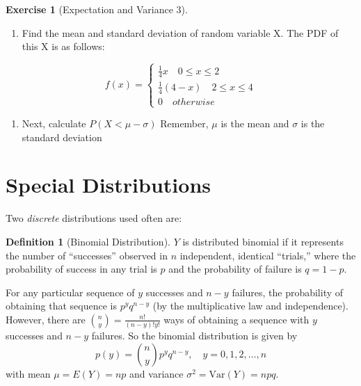 \documentclass[
]{book}
\providecommand{\tightlist}{%
  \setlength{\itemsep}{0pt}\setlength{\parskip}{0pt}}
\theoremstyle{definition}
\newtheorem{definition}{Definition}[chapter]
\theoremstyle{definition}
\theoremstyle{definition}
\newtheorem{exercise}{Exercise}[chapter]
\theoremstyle{definition}
\theoremstyle{remark}
\begin{document}
\begin{exercise}[Expectation and Variance 3]
\protect\hypertarget{exr:expvar3}{}{\label{exr:expvar3} {} }

\begin{enumerate}
\def\labelenumi{\arabic{enumi}.}
\tightlist
\item
  Find the mean and standard deviation of random variable X. The PDF of this X is as follows:
\end{enumerate}

\[f(x) =  \begin{cases}
              \frac{1}{4}x \quad 0 \leq x \leq 2\\
               \frac{1}{4}(4 - x)  \quad 2 \leq x \leq 4\\
               0 \quad otherwise
            \end{cases}
               \]

\begin{enumerate}
\def\labelenumi{\arabic{enumi}.}
\setcounter{enumi}{1}
\tightlist
\item
  Next, calculate \(P(X < \mu - \sigma)\) Remember, \(\mu\) is the mean and \(\sigma\) is the standard deviation
\end{enumerate}
\end{exercise}

\hypertarget{special-distributions}{%
\section{Special Distributions}\label{special-distributions}}

Two \emph{discrete} distributions used often are:

\begin{definition}[Binomial Distribution]
\protect\hypertarget{def:unnamed-chunk-274}{}{\label{def:unnamed-chunk-274} {} }\(Y\) is distributed binomial if it represents the number of ``successes'' observed in \(n\) independent, identical ``trials,'' where the probability of success in any trial is \(p\) and the probability of failure is \(q=1-p\).
\end{definition}

For any particular sequence of \(y\) successes and \(n-y\) failures, the probability of obtaining that sequence is \(p^y q^{n-y}\) (by the multiplicative law and independence). However, there are \(\binom{n}{y}=\frac{n!}{(n-y)!y!}\) ways of obtaining a sequence with \(y\) successes and \(n-y\) failures. So the binomial distribution is given by \[p(y)=\binom{n}{y}p^y q^{n-y}, \quad y=0,1,2,\ldots,n\] with mean \(\mu=E(Y)=np\) and variance \(\sigma^2=\text{Var}(Y)=npq\).
\end{document}

